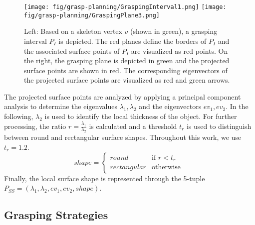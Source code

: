 \begin{itemize}
\begin{figure}[tbh]%
\centering
\texttt{[image: fig/grasp-planning/GraspingInterval1.png]}
\texttt{[image: fig/grasp-planning/GraspingPlane3.png]}
\caption{Left: Based on a skeleton vertex $v$ (shown in green), a grasping interval $P_I$ is depicted. The red planes define the borders of $P_I$ and the associated surface points of $P_I$ are visualized as red points. On the right, the grasping plane is depicted in green and the projected surface points are shown in red. The corresponding eigenvectors of the projected surface points are visualized as red and green arrows.}%
\label{fig:grasping-interval}%
\end{figure}

The projected surface points are analyzed by applying a principal component analysis to determine the eigenvalues $\lambda_1, \lambda_2$ and the eigenvectors $ev_1, ev_2$. In the following, $\lambda_2$ is used to identify the local thickness of the object.
For further processing, the ratio $r = \frac{\lambda_1}{\lambda_2}$ is calculated and a threshold $t_r$ is used to distinguish between round and rectangular surface shapes. Throughout this work, we use $t_r = 1.2$.
\begin{equation}
shape = \begin{cases}
     round & \text{if } r < t_r \\
     rectangular & \text{otherwise }
   \end{cases}
\label{eq:shape-form}
\end{equation}
Finally, the local surface shape is represented through the 5-tuple $P_{SS} = (\lambda_1, \lambda_2, ev_1, ev_2, shape)$.

\end{itemize}


\subsection{Grasping Strategies}

